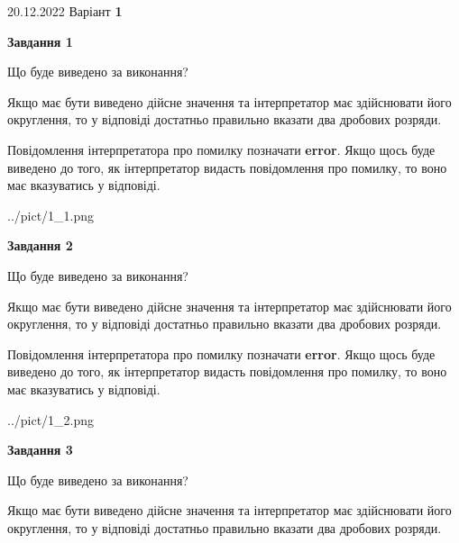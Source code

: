 \documentclass[12pt, ukrainian]{article}
\begin{document}
{20.12.2022 Варіант \No \textbf { 1 }\par}
{
\begin {Large}

{\begin {center}\textbf{Завдання 1}\end {center}}\par
Що буде виведено за виконання? \par

Якщо має бути виведено дійсне значення та інтерпретатор має здійснювати його округлення, 
то у відповіді достатньо правильно вказати два дробових розряди.

Повідомлення інтерпретатора про помилку позначати \textbf{error}.
Якщо щось буде виведено до того, як інтерпретатор видасть повідомлення про помилку, 
то воно має вказуватись у відповіді. \par

\begin{center}
	{../pict/1_1.png}
\end{center}
\newpage

{\begin {center}\textbf{Завдання 2}\end {center}}\par
Що буде виведено за виконання? \par

Якщо має бути виведено дійсне значення та інтерпретатор має здійснювати його округлення, 
то у відповіді достатньо правильно вказати два дробових розряди.

Повідомлення інтерпретатора про помилку позначати \textbf{error}.
Якщо щось буде виведено до того, як інтерпретатор видасть повідомлення про помилку, 
то воно має вказуватись у відповіді. \par

\begin{center}
	{../pict/1_2.png}
\end{center}
\newpage

{\begin {center}\textbf{Завдання 3}\end {center}}\par
Що буде виведено за виконання? \par

Якщо має бути виведено дійсне значення та інтерпретатор має здійснювати його округлення, 
то у відповіді достатньо правильно вказати два дробових розряди.


\end{Large}}
\end{document}
